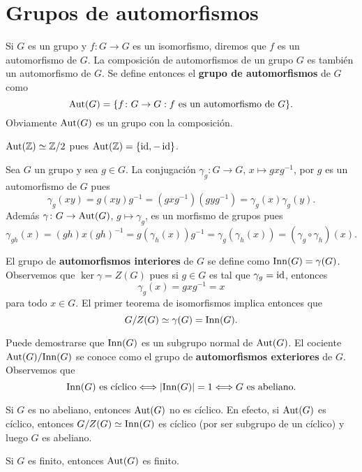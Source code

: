 \chapter{Grupos de automorfismos}

Si $G$ es un grupo y 
$f\colon G\to G$ es un isomorfismo, diremos que $f$ es un automorfismo de $G$. 
La composición de automorfismos de un grupo $G$ es también un automorfismo de $G$. 
Se define entonces el \textbf{grupo de automorfismos} de $G$ como
\[
\operatorname{Aut}(G)=\{f\colon G\to G:f\text{ es un automorfismo de $G$}\}.
\] 
Obviamente $\operatorname{Aut}(G)$ es un grupo con la composición. 

\begin{example}
$\operatorname{Aut}(\mathbb{Z})\simeq\mathbb{Z}/2$ pues $\operatorname{Aut}(\mathbb{Z})=\{\operatorname{id},-\operatorname{id}\}$. 
\end{example}

\begin{example}
Sea $G$ un grupo y sea $g\in G$. La conjugación 
$\gamma_g\colon G\to G$, $x\mapsto gxg^{-1}$, 
por $g$ es un automorfismo de $G$ pues
\[
\gamma_g(xy)=g(xy)g^{-1}=(gxg^{-1})(gyg^{-1})=\gamma_g(x)\gamma_g(y).
\]
Además $\gamma\colon G\to\operatorname{Aut}(G)$, $g\mapsto\gamma_g$, es un morfismo de grupos pues
\[
\gamma_{gh}(x)=(gh)x(gh)^{-1}=g(\gamma_h(x))g^{-1}=\gamma_g(\gamma_h(x))=(\gamma_g\circ\gamma_h)(x).
\]

El grupo de \textbf{automorfismos interiores} de $G$ se define como 
$\mathrm{Inn}(G)=\gamma(G)$. Observemos que $\ker\gamma=Z(G)$ pues
si $g\in G$ es tal que $\gamma_g=\operatorname{id}$, entonces 
\[
\gamma_g(x)=gxg^{-1}=x
\]
para todo $x\in G$. El primer teorema de isomorfismos implica entonces que
\[
G/Z(G)\simeq \gamma(G)=\mathrm{Inn}(G).
\]
\end{example}

Puede demostrarse que $\mathrm{Inn}(G)$ es un subgrupo normal de $\operatorname{Aut}(G)$. El cociente $\operatorname{Aut}(G)/\mathrm{Inn}(G)$ se conoce como el grupo de \textbf{automorfismos exteriores} de $G$. Observemos que
\[
\mathrm{Inn}(G)\text{ es cíclico}\Longleftrightarrow
|\mathrm{Inn}(G)|=1\Longleftrightarrow
G\text{ es abeliano.}
\]

\begin{example}
	Si $G$ es no abeliano, entonces $\operatorname{Aut}(G)$ no es cíclico.	 En efecto, si $\operatorname{Aut}(G)$ es cíclico,
	entonces $G/Z(G)\simeq\mathrm{Inn}(G)$ es cíclico (por ser subgrupo de un cíclico) y luego
	$G$ es abeliano. 
\end{example}

\begin{exercise}
	Si $G$ es finito, entonces $\operatorname{Aut}(G)$ es finito.	
\end{exercise}

